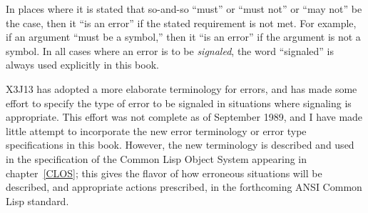 In places where it is stated that so-and-so ``must'' or ``must not''
or ``may not''  be the case, then it ``is an error'' if the stated requirement
is not met.  For example, if an argument ``must be a symbol,'' then it
``is an error'' if the argument is not a symbol.  In all cases where
an error is to be {\it signaled}, the word ``signaled'' is always used
explicitly in this book.

\begin{newer}
X3J13 has adopted a more elaborate terminology for errors,
and has made some effort to specify the type of error to be signaled
in situations where signaling is appropriate.  This effort
was not complete as of September 1989, and I have made little
attempt to incorporate the new error terminology or
error type specifications in this book.  However, the new terminology
is described and used in the specification of the
Common Lisp Object System appearing in chapter~\ref{CLOS}; this gives
the flavor of how erroneous situations will be described,
and appropriate actions prescribed, in the forthcoming ANSI Common
Lisp standard.
\end{newer}

